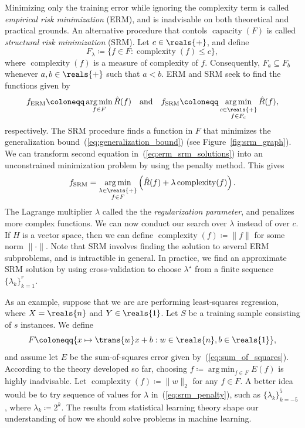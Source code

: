 \documentclass[11pt,a4paper]{article}
\numberwithin{equation}{section}
\newcommand{\capacity}{\operatorname{capacity}}
\newcommand{\complexity}{\operatorname{complexity}}
\newcommand{\argmin}{\operatorname*{arg\,min}}
\begin{document}
Minimizing only the training error while ignoring the complexity term is called
\emph{empirical risk minimization} (ERM), and is inadvisable on both theoretical
and practical grounds. An alternative procedure that contols $\capacity(F)$ is
called \emph{structural risk minimization} (SRM). Let $c \in \reals{+}$, and
define
\begin{equation}
	F_\lambda \coloneqq \{ f \in F : \complexity(f) \leq c \},
	\label{eq:regularized_family}
\end{equation}
where $\complexity(f)$ is a measure of complexity of $f$. Consequently, $F_a
\subseteq F_b$ whenever $a, b \in \reals{+}$ such that $a < b$. ERM and SRM seek
to find the functions given by
\begin{equation}
	f_{\text{ERM}} \coloneqq \argmin_{f \in F} \hat{R}(f)
	\quad\text{and}\quad
	f_{\text{SRM}} \coloneqq \argmin_{\substack{c \in \reals{+} \\ f \in F_c}}
		\hat{R}(f),
	\label{eq:erm_srm_solutions}
\end{equation}
respectively. The SRM procedure finds a function in $F$ that minimizes the
generalization bound~(\ref{eq:generalization_bound}) (see
Figure~\ref{fig:srm_graph}). We can transform second equation
in~(\ref{eq:erm_srm_solutions}) into an unconstrained minimization problem by
using the penalty method. This gives
\begin{equation}
	f_{\text{SRM}} = \argmin_{\substack{\lambda \in \reals{+} \\ f \in F}}
		\left(\hat{R}(f) + \lambda\complexity(f)\right).
	\label{eq:srm_penalty}
\end{equation}
The Lagrange multiplier $\lambda$ called the the \emph{regularization
parameter}, and penalizes more complex functions. We can now conduct our search
over $\lambda$ instead of over $c$. If $H$ is a vector space, then we can define
$\complexity(f) \coloneqq \|f\|$ for some norm ${\|\cdot\|}$. Note that SRM
involves finding the solution to several ERM subproblems, and is intractible in
general. In practice, we find an approximate SRM solution by using
cross-validation to choose $\lambda^\star$ from a finite sequence $\{ \lambda_k
\}_{k = 1}^r$.

As an example, suppose that we are are performing least-squares regression,
where $X = \reals{n}$ and $Y \in \reals{1}$. Let $S$ be a training sample
consisting of $s$ instances. We define
\[
	F \coloneqq \{ x \mapsto \trans{w}x + b : w \in \reals{n}, b \in
		\reals{1} \},
	\label{eq:affine_family}
\]
and assume let $E$ be the sum-of-squares error given
by~(\ref{eq:sum_of_squares}). According to the theory developed so far, choosing
$f \coloneqq \argmin_{f \in F} E(f)$ is highly inadvisable. Let $\complexity(f)
\coloneqq \|w\|_2$ for any $f \in F$. A better idea would be to try sequence of
values for $\lambda$ in~(\ref{eq:srm_penalty}), such as $\{ \lambda_k \}_{k =
-5}^5$, where $\lambda_k \coloneqq 2^k$. The results from statistical learning
theory shape our understanding of how we should solve problems in machine
learning.
\end{document}
